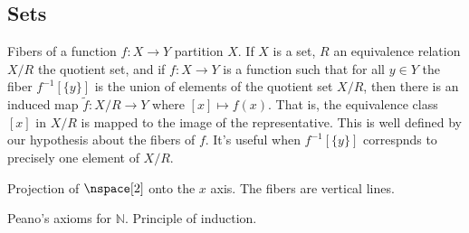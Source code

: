 \documentclass{article}                                                        %
\begin{document}
        \subsection{Sets}
            Fibers of a function $f:X\rightarrow{Y}$ partition $X$.
            If $X$ is a set, $R$ an equivalence relation $X/R$ the quotient set,
            and if $f:X\rightarrow{Y}$ is a function such that for all $y\in{Y}$
            the fiber $f^{\minus{1}}[\{y\}]$ is the union of elements of the
            quotient set $X/R$, then there is an induced map
            $\tilde{f}:X/R\rightarrow{Y}$ where $[x]\mapsto{f}(x)$. That is,
            the equivalence class $[x]$ in $X/R$ is mapped to the image of
            the representative. This is well defined by our hypothesis about the
            fibers of $f$. It's useful when $f^{\minus{1}}[\{y\}]$ correspnds to
            precisely one element of $X/R$.
            \begin{example}
                Projection of $\nspace[2]$ onto the $x$ axis. The fibers are
                vertical lines.
            \end{example}
            Peano's axioms for $\mathbb{N}$. Principle of induction.
\end{document}
